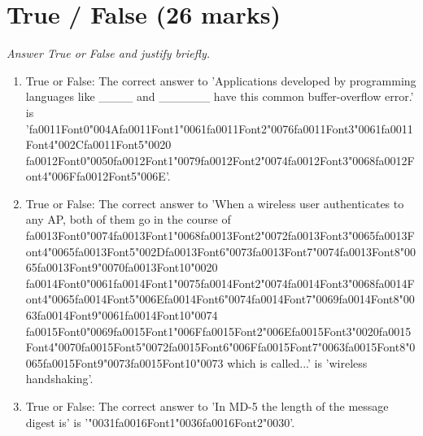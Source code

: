 \documentclass[12pt]{article}
\begin{document}
\section*{True / False (26 marks)}
\textit{Answer True or False and justify briefly.}
\begin{enumerate}[label=\arabic*.]
\item True or False: The correct answer to 'Applications developed by programming languages like \_\_\_\_ and \_\_\_\_\_\_ have this common buffer-overflow error.' is '{\csname fa0011Font0\endcsname\char"004A}{\csname fa0011Font1\endcsname\char"0061}{\csname fa0011Font2\endcsname\char"0076}{\csname fa0011Font3\endcsname\char"0061}{\csname fa0011Font4\endcsname\char"002C}{\csname fa0011Font5\endcsname\char"0020} {\csname fa0012Font0\endcsname\char"0050}{\csname fa0012Font1\endcsname\char"0079}{\csname fa0012Font2\endcsname\char"0074}{\csname fa0012Font3\endcsname\char"0068}{\csname fa0012Font4\endcsname\char"006F}{\csname fa0012Font5\endcsname\char"006E}'.
\item True or False: The correct answer to 'When a wireless user authenticates to any AP, both of them go in the course of {\csname fa0013Font0\endcsname\char"0074}{\csname fa0013Font1\endcsname\char"0068}{\csname fa0013Font2\endcsname\char"0072}{\csname fa0013Font3\endcsname\char"0065}{\csname fa0013Font4\endcsname\char"0065}{\csname fa0013Font5\endcsname\char"002D}{\csname fa0013Font6\endcsname\char"0073}{\csname fa0013Font7\endcsname\char"0074}{\csname fa0013Font8\endcsname\char"0065}{\csname fa0013Font9\endcsname\char"0070}{\csname fa0013Font10\endcsname\char"0020} {\csname fa0014Font0\endcsname\char"0061}{\csname fa0014Font1\endcsname\char"0075}{\csname fa0014Font2\endcsname\char"0074}{\csname fa0014Font3\endcsname\char"0068}{\csname fa0014Font4\endcsname\char"0065}{\csname fa0014Font5\endcsname\char"006E}{\csname fa0014Font6\endcsname\char"0074}{\csname fa0014Font7\endcsname\char"0069}{\csname fa0014Font8\endcsname\char"0063}{\csname fa0014Font9\endcsname\char"0061}{\csname fa0014Font10\endcsname\char"0074} {\csname fa0015Font0\endcsname\char"0069}{\csname fa0015Font1\endcsname\char"006F}{\csname fa0015Font2\endcsname\char"006E}{\csname fa0015Font3\endcsname\char"0020}{\csname fa0015Font4\endcsname\char"0070}{\csname fa0015Font5\endcsname\char"0072}{\csname fa0015Font6\endcsname\char"006F}{\csname fa0015Font7\endcsname\char"0063}{\csname fa0015Font8\endcsname\char"0065}{\csname fa0015Font9\endcsname\char"0073}{\csname fa0015Font10\endcsname\char"0073} which is called...' is 'wireless handshaking'.
\item True or False: The correct answer to 'In MD-5 the length of the message digest is' is '{\char"0031}{\csname fa0016Font1\endcsname\char"0036}{\csname fa0016Font2\endcsname\char"0030}'.

\end{enumerate}
\end{document}
